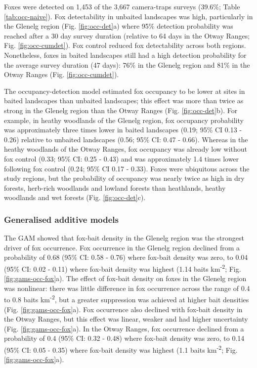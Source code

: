 \documentclass[11pt,a4paper,titlepage,twoside,openright]{style/unimelbthesis}
\begin{document}
\begin{mainmatter}
Foxes were detected on 1,453 of the 3,667 camera-traps surveys (39.6\%; Table \ref{tab:occ-naive}). Fox detectability in unbaited landscapes was high, particularly in the Glenelg region (Fig. \ref{fig:occ-det}a) where 95\% detection probability was reached after a 30 day survey duration (relative to 64 days in the Otway Ranges; Fig. \ref{fig:occ-cumdet}). Fox control reduced fox detectability across both regions. Nonetheless, foxes in baited landscapes still had a high detection probability for the average survey duration (47 days): 76\% in the Glenelg region and 81\% in the Otway Ranges (Fig. \ref{fig:occ-cumdet}).

The occupancy-detection model estimated fox occupancy to be lower at sites in baited landscapes than unbaited landscapes; this effect was more than twice as strong in the Glenelg region than the Otway Ranges (Fig. \ref{fig:occ-det}b). For example, in heathy woodlands of the Glenelg region, fox occupancy probability was approximately three times lower in baited landscapes (0.19; 95\% CI 0.13 - 0.26) relative to unbaited landscapes (0.56; 95\% CI: 0.47 - 0.66). Whereas in the heathy woodlands of the Otway Ranges, fox occupancy was already low without fox control (0.33; 95\% CI: 0.25 - 0.43) and was approximately 1.4 times lower following fox control (0.24; 95\% CI 0.17 - 0.33). Foxes were ubiquitous across the study regions, but the probability of occupancy was nearly twice as high in dry forests, herb-rich woodlands and lowland forests than heathlands, heathy woodlands and wet forests (Fig. \ref{fig:occ-det}c).

\hypertarget{generalised-additive-models-1}{%
\subsubsection{Generalised additive models}\label{generalised-additive-models-1}}

The GAM showed that fox-bait density in the Glenelg region was the strongest driver of fox occurrence. Fox occurrence in the Glenelg region declined from a probability of 0.68 (95\% CI: 0.58 - 0.76) where fox-bait density was zero, to 0.04 (95\% CI: 0.02 - 0.11) where fox-bait density was highest (1.14 baits km\textsuperscript{-2}; Fig. \ref{fig:gams-occ-fox}a). The effect of fox-bait density on foxes in the Glenelg region was nonlinear: there was little difference in fox occurrence across the range of 0.4 to 0.8 baits km\textsuperscript{-2}, but a greater suppression was achieved at higher bait densities (Fig. \ref{fig:gams-occ-fox}a). Fox occurrence also declined with fox-bait density in the Otway Ranges, but this effect was linear, weaker and had higher uncertainty (Fig. \ref{fig:gams-occ-fox}a). In the Otway Ranges, fox occurrence declined from a probability of 0.4 (95\% CI: 0.32 - 0.48) where fox-bait density was zero, to 0.14 (95\% CI: 0.05 - 0.35) where fox-bait density was highest (1.1 baits km\textsuperscript{-2}; Fig. \ref{fig:gams-occ-fox}a).


\end{mainmatter}
\end{document}
